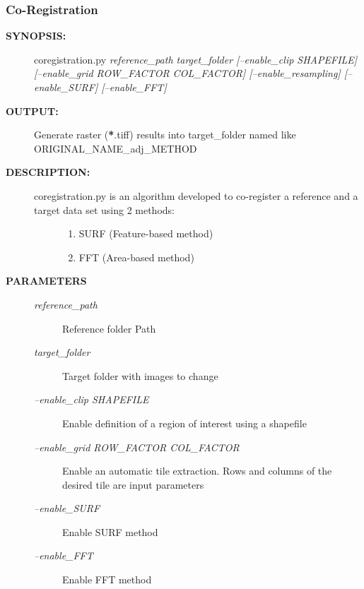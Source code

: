 \documentclass[letterpaper,10pt,english]{sphinxmanual}
\begin{document}
\subsubsection{Co-Registration}
\label{user:co-registration}\begin{description}
\item[{\textbf{SYNOPSIS:}}] \leavevmode
coregistration.py \emph{reference\_path target\_folder {[}--enable\_clip SHAPEFILE{]} {[}--enable\_grid ROW\_FACTOR COL\_FACTOR{]} {[}--enable\_resampling{]} {[}--enable\_SURF{]} {[}--enable\_FFT{]}}

\item[{\textbf{OUTPUT:}}] \leavevmode
Generate raster ({\color{red}\bfseries{}*}.tiff) results into target\_folder named like ORIGINAL\_NAME\_adj\_METHOD

\item[{\textbf{DESCRIPTION:}}] \leavevmode\begin{description}
\item[{coregistration.py is an algorithm developed to co-register a reference and a target data set using 2 methods:}] \leavevmode\begin{enumerate}
\item {} 
SURF (Feature-based method)

\item {} 
FFT (Area-based method)

\end{enumerate}

\end{description}

\item[{\textbf{PARAMETERS}}] \leavevmode\begin{description}
\item[{\emph{reference\_path}}] \leavevmode
Reference folder Path

\item[{\emph{target\_folder}}] \leavevmode
Target folder with images to change

\item[{\emph{--enable\_clip SHAPEFILE}}] \leavevmode
Enable definition of a region of interest using a shapefile

\item[{\emph{--enable\_grid ROW\_FACTOR COL\_FACTOR}}] \leavevmode
Enable an automatic tile extraction. Rows and columns of the desired tile are input parameters

\item[{\emph{--enable\_SURF}}] \leavevmode
Enable SURF method

\item[{\emph{--enable\_FFT}}] \leavevmode
Enable FFT method

\end{description}

\end{description}
\end{document}

